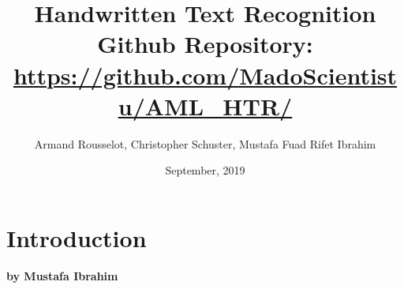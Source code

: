 \documentclass{article}
\begin{document}
\title{Handwritten Text Recognition \\ \vspace{3mm}
\small Github Repository: \url{https://github.com/MadoScientistu/AML_HTR/}}
\date{September, 2019}
\author{Armand Rousselot, Christopher Schuster, Mustafa Fuad Rifet Ibrahim}

\maketitle
\newpage
\tableofcontents

\newpage
\section{Introduction}

\textbf{by Mustafa Ibrahim} \\
\end{document}
